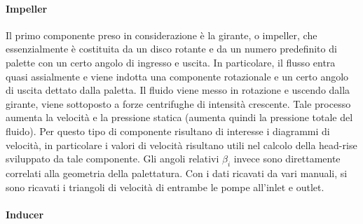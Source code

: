 
\paragraph{Impeller}

Il primo componente preso in considerazione è la girante, o impeller, che essenzialmente è costituita da un disco rotante e da un numero predefinito di palette con un certo angolo di ingresso e uscita. In particolare, il flusso entra quasi assialmente e viene indotta una componente rotazionale e un certo angolo di uscita dettato dalla paletta. Il fluido viene messo in rotazione e uscendo dalla girante, viene sottoposto a forze centrifughe di intensità crescente. Tale processo aumenta la velocità e la pressione statica (aumenta quindi la pressione totale del fluido). Per  questo tipo di componente risultano di interesse i diagrammi di velocità, in particolare i valori di velocità risultano utili nel calcolo della head-rise sviluppato da tale componente. Gli angoli relativi $\beta_i$ invece sono direttamente correlati alla geometria della palettatura. Con i dati ricavati da vari manuali, si sono ricavati i triangoli di velocità di entrambe le pompe all'inlet e outlet. 


\paragraph{Inducer}


